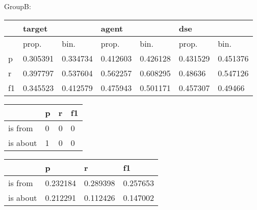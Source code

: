 \documentclass[a4paper, 12pt]{article}
\begin{document}
GroupB:
\begin{table}[h!]
\centering
{}
\begin{tabular}{l|ll|ll|ll}
\hline
   & \multicolumn{2}{l}{target} & \multicolumn{2}{l}{agent} & \multicolumn{2}{l}{dse} \\ \hline
   & prop.& bin.& prop.& bin.& prop.& bin.\\
 \hline
p  &0.305391&0.334734& 0.412603 & 0.426128 &0.431529  & 0.451376  \\
r  &0.397797&0.537604& 0.562257 & 0.608295 & 0.48636  & 0.547126  \\
f1 &0.345523&0.412579& 0.475943 & 0.501171 &0.457307  &  0.49466  \\ \hline
\end{tabular}

\centering
\begin{tabular}{l|l|l|l}
\hline
         & p & r & f1    \\\hline
is from  & 0&    0& 0\\
is about &1& 0& 0\\
\hline
\end{tabular}
\centering
{}
\begin{tabular}{l|l|l|l}
\hline
         & p & r & f1    \\\hline
is from  & 0.232184& 0.289398& 0.257653\\
is about &0.212291& 0.112426& 0.147002\\
\hline
\end{tabular}
\end{table}
\end{document}
